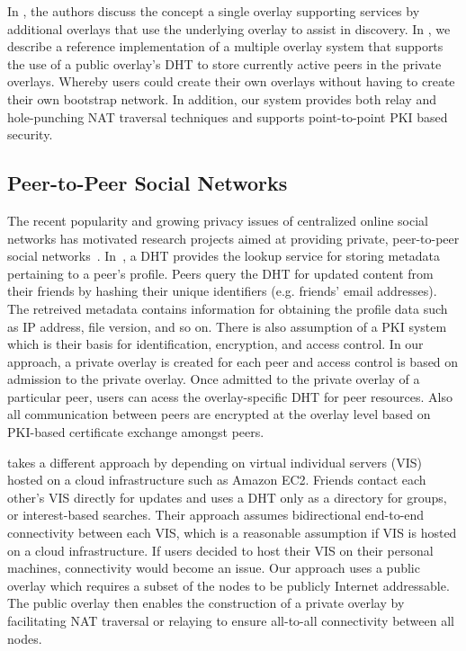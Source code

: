 \documentclass[letterpaper,twocolumn,10pt]{article}
\begin{document}
In \cite{one_ring, randpeer, can_multicast}, the authors
discuss the concept a single overlay supporting services by additional overlays
that use the underlying overlay to assist in discovery.  In \cite{icdcs10}, we
describe a reference implementation of a multiple overlay system that supports
the use of a public overlay's DHT to store currently active peers in the private
overlays.  Whereby users could create their own overlays without having to
create their own bootstrap network.  In addition, our system provides both relay
and hole-punching NAT traversal techniques and supports point-to-point PKI
based security.

\subsection{Peer-to-Peer Social Networks}
The recent popularity and growing privacy issues of centralized online social networks 
has motivated research projects aimed at providing private, peer-to-peer
social networks~\cite{peerson, matryoshkas, tribler-osn, vis-a-vis}.
In~\cite{peerson}, a DHT provides the lookup service for storing metadata 
pertaining to a peer's profile. Peers query the DHT for updated content from 
their friends by hashing their unique identifiers (e.g. friends' email addresses). 
The retreived metadata contains information for obtaining the profile data such as
IP address, file version, and so on. There is also assumption of a PKI system which
is their basis for identification, encryption, and access control. In our
approach, a private overlay is created for each peer and access control is
based on admission to the private overlay. Once admitted to the private
overlay of a particular peer, users can acess the overlay-specific DHT for 
peer resources. Also all communication between peers are encrypted at the
overlay level based on PKI-based certificate exchange amongst peers.

\cite{vis-a-vis} takes a different approach by depending on virtual individual
servers (VIS) hosted on a cloud infrastructure such as Amazon EC2. Friends contact
each other's VIS directly for updates and uses a DHT only as a directory for
groups, or interest-based searches. Their approach assumes bidirectional
end-to-end connectivity between each VIS, which is a reasonable assumption if VIS 
is hosted on a cloud infrastructure. If users decided to host their VIS on their personal
machines, connectivity would become an issue. Our approach uses a public overlay
which requires a subset of the nodes to be publicly Internet addressable. The
public overlay then enables the construction of a private overlay by facilitating
NAT traversal or relaying to ensure all-to-all connectivity between all nodes.
\end{document}
